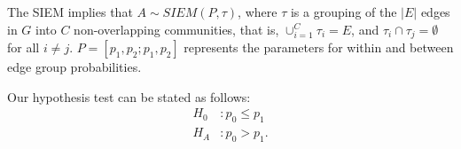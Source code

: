 \documentclass[11pt]{article}
\begin{document}
The SIEM implies that 
%
%
%
%
%
%
$    A \sim SIEM(P,\tau)$,
where $\tau$ is a grouping of the $|E|$ edges in $G$ into $C$ non-overlapping communities, that is,  
$\cup_{i=1}^{C} \tau_i  =E$, and $\tau_i \cap \tau_j = \emptyset$ for all $i \neq j$. 
$P=[p_1, p_2; p_1, p_2]$ represents the parameters for within and between edge group probabilities. 

Our hypothesis test can be stated as follows:
\begin{align*}
        H_0&: p_0 \leq p_1 \\
        H_A&: p_0 > p_1.
\end{align*}
\end{document}
